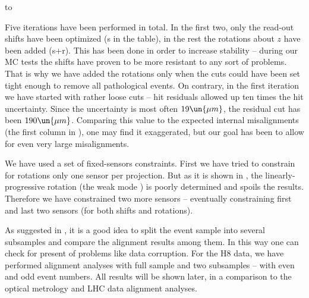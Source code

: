 \hbox to

\noindent Five iterations have been performed in total. In the first two, only the read-out shifts have been optimized (s in the table), in the rest the rotations about $z$ have been added (s+r). This has been done in order to increase stability -- during our MC tests the shifts have proven to be more resistant to any sort of problems. That is why we have added the rotations only when the cuts could have been set tight enough to remove all pathological events. On contrary, in the first iteration we have started with rather loose cuts -- hit residuals allowed up ten times the hit uncertainty. Since the uncertainty is most often $19\un{\mu m}$, the residual cut has been $190\un{\mu m}$. Comparing this value to the expected internal misalignments (the first column in ), one may find it exaggerated, but our goal has been to allow for even very large misalignments.


We have used a set of fixed-sensors constraints. First we have tried to constrain for rotations only one sensor per projection. But as it is shown in , the linearly-progressive rotation (the weak mode ) is poorly determined and spoils the results. Therefore we have constrained two more sensors -- eventually constraining first and last two sensors (for both shifts and rotations).


As suggested in , it is a good idea to split the event sample into several subsamples and compare the alignment results among them. In this way one can check for present of problems like data corruption. For the H8 data, we have performed alignment analyses with full sample and two subsamples -- with even and odd event numbers. All results will be shown later, in a comparison to the optical metrology and LHC data alignment analyses.


